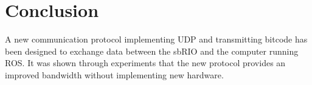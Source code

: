 \section{Conclusion}
A new communication protocol implementing UDP and transmitting bitcode has been designed to exchange data between the sbRIO and the computer running ROS. It was shown through experiments that the new protocol provides an improved bandwidth without implementing new hardware. 
